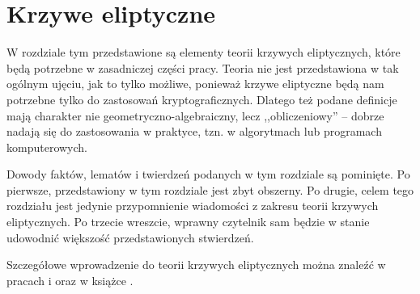 \chapter{Krzywe eliptyczne}

W rozdziale tym przedstawione są elementy teorii krzywych eliptycznych,
które będą potrzebne w zasadniczej części pracy.
Teoria nie jest przedstawiona w tak ogólnym ujęciu, jak to tylko możliwe,
ponieważ krzywe eliptyczne będą nam potrzebne
tylko do zastosowań kryptograficznych.
Dlatego też podane definicje mają charakter
nie geometryczno-algebraiczny, lecz ,,obliczeniowy'' --
dobrze nadają się do zastosowania w praktyce,
tzn. w algorytmach lub programach komputerowych.

Dowody faktów, lematów i twierdzeń podanych w tym rozdziale są pominięte.
Po pierwsze, przedstawiony w tym rozdziale jest zbyt obszerny.
Po drugie, celem tego rozdziału jest jedynie przypomnienie wiadomości
z zakresu teorii krzywych eliptycznych.
Po trzecie wreszcie,
wprawny czytelnik sam będzie w stanie udowodnić
większość przedstawionych stwierdzeń.

Szczegółowe wprowadzenie do teorii krzywych eliptycznych
można znaleźć w pracach \cite{ecintro1} i \cite{ecintro2}
oraz w książce \cite{silverman}.






